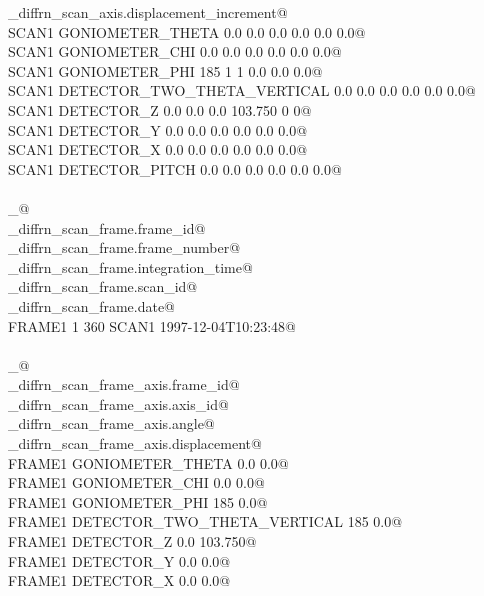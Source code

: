 \documentclass[10pt,a4paper,twoside,notitlepage]{article}
\begin{document}
\begin{flushleft}
\begin{list}{}{}
\mbox{}\verb@_diffrn_scan_axis.displacement_increment@\\
\mbox{}\verb@ SCAN1 GONIOMETER_THETA 0.0 0.0 0.0 0.0 0.0 0.0@\\
\mbox{}\verb@ SCAN1 GONIOMETER_CHI 0.0 0.0 0.0 0.0 0.0 0.0@\\
\mbox{}\verb@ SCAN1 GONIOMETER_PHI 185 1 1 0.0 0.0 0.0@\\
\mbox{}\verb@ SCAN1 DETECTOR_TWO_THETA_VERTICAL 0.0 0.0 0.0 0.0 0.0 0.0@\\
\mbox{}\verb@ SCAN1 DETECTOR_Z 0.0 0.0 0.0 103.750 0 0@\\
\mbox{}\verb@ SCAN1 DETECTOR_Y 0.0 0.0 0.0 0.0 0.0 0.0@\\
\mbox{}\verb@ SCAN1 DETECTOR_X 0.0 0.0 0.0 0.0 0.0 0.0@\\
\mbox{}\verb@ SCAN1 DETECTOR_PITCH 0.0 0.0 0.0 0.0 0.0 0.0@\\
\mbox{}\verb@@\\
\mbox{}\verb@loop_@\\
\mbox{}\verb@_diffrn_scan_frame.frame_id@\\
\mbox{}\verb@_diffrn_scan_frame.frame_number@\\
\mbox{}\verb@_diffrn_scan_frame.integration_time@\\
\mbox{}\verb@_diffrn_scan_frame.scan_id@\\
\mbox{}\verb@_diffrn_scan_frame.date@\\
\mbox{}\verb@ FRAME1 1 360 SCAN1 1997-12-04T10:23:48@\\
\mbox{}\verb@@\\
\mbox{}\verb@loop_@\\
\mbox{}\verb@_diffrn_scan_frame_axis.frame_id@\\
\mbox{}\verb@_diffrn_scan_frame_axis.axis_id@\\
\mbox{}\verb@_diffrn_scan_frame_axis.angle@\\
\mbox{}\verb@_diffrn_scan_frame_axis.displacement@\\
\mbox{}\verb@ FRAME1 GONIOMETER_THETA 0.0 0.0@\\
\mbox{}\verb@ FRAME1 GONIOMETER_CHI 0.0 0.0@\\
\mbox{}\verb@ FRAME1 GONIOMETER_PHI 185 0.0@\\
\mbox{}\verb@ FRAME1 DETECTOR_TWO_THETA_VERTICAL 185 0.0@\\
\mbox{}\verb@ FRAME1 DETECTOR_Z 0.0 103.750@\\
\mbox{}\verb@ FRAME1 DETECTOR_Y 0.0 0.0@\\
\mbox{}\verb@ FRAME1 DETECTOR_X 0.0 0.0@\\

\end{list}
\end{flushleft}
\end{document}
